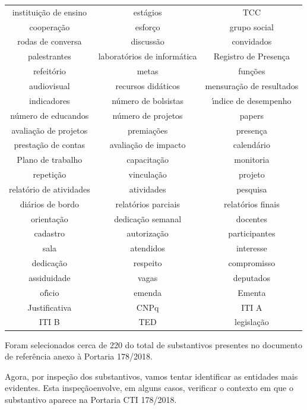 \documentclass[
12pt,		%
openright,	%
twoside,  %
a4paper,			%
chapter=TITLE,		%
english,			%
french,				%
spanish,			%
brazil				%
]{USPSC-classe/USPSC}
\begin{document}
\begin{table}[htb]
\begin{tabular}{|c|c|c|}
institui\c{c}\~ao de ensino  &  est\'agios  &  TCC \\
coopera\c{c}\~ao  &  esfor\c{c}o  &  grupo social \\
rodas de conversa  &  discuss\~ao  &  convidados \\
palestrantes  &  laborat\'orios de inform\'atica  &  Registro de Presen\c{c}a \\
refeit\'orio  &  metas  &  fun\c{c}\~oes \\
audiovisual  &  recursos did\'aticos  &  mensura\c{c}\~ao de resultados \\
indicadores  &  n\'umero de bolsistas  &  \'{\i}ndice de desempenho \\
n\'umero de educandos  &  n\'umero de projetos  &  papers \\
avalia\c{c}\~ao de projetos  &  premia\c{c}\~oes  &  presen\c{c}a  \\
presta\c{c}\~ao de contas  &  avalia\c{c}\~ao de impacto  &  calend\'ario \\
Plano de trabalho  &  capacita\c{c}\~ao  &  monitoria \\
repeti\c{c}\~ao  &  vincula\c{c}\~ao  &  projeto \\
relat\'orio de atividades  &  atividades  &  pesquisa \\
di\'arios de bordo  &  relat\'orios parciais  &  relat\'orios finais \\
orienta\c{c}\~ao  &  dedica\c{c}\~ao semanal  &  docentes \\
cadastro  &  autoriza\c{c}\~ao  &  participantes \\
sala  &  atendidos  &  interesse \\
dedica\c{c}\~ao  &  respeito  &  compromisso \\
assiduidade  &  vagas  &  deputados \\
of\'{\i}cio  &  emenda  &  Ementa \\
Justificativa  &  CNPq  &  ITI A \\
ITI B  &  TED  &  legisla\c{c}\~ao \\
\hline
\end{tabular}
\end{table}


Foram selecionados cerca de 220 do total de substantivos presentes no documento de refer\^encia anexo \`a Portaria 178/2018.









Agora, por inspe\c{c}\~ao dos substantivos, vamos tentar identificar as entidades mais evidentes. Esta \textquotedbl inspe\c{c}\~ao\textquotedbl  envolve, em alguns casos, verificar o contexto em que o substantivo aparece na Portaria CTI 178/2018.
\end{document}
